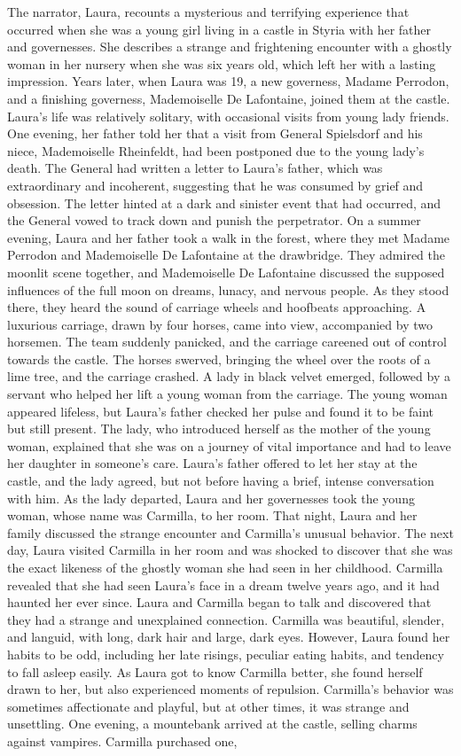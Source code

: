\documentclass{article} %
\begin{document}
The narrator, Laura, recounts a mysterious and terrifying experience that occurred when she was a young girl living in a castle in Styria with her father and governesses. She describes a strange and frightening encounter with a ghostly woman in her nursery when she was six years old, which left her with a lasting impression. Years later, when Laura was 19, a new governess, Madame Perrodon, and a finishing governess, Mademoiselle De Lafontaine, joined them at the castle. Laura's life was relatively solitary, with occasional visits from young lady friends. One evening, her father told her that a visit from General Spielsdorf and his niece, Mademoiselle Rheinfeldt, had been postponed due to the young lady's death. The General had written a letter to Laura's father, which was extraordinary and incoherent, suggesting that he was consumed by grief and obsession. The letter hinted at a dark and sinister event that had occurred, and the General vowed to track down and punish the perpetrator. On a summer evening, Laura and her father took a walk in the forest, where they met Madame Perrodon and Mademoiselle De Lafontaine at the drawbridge. They admired the moonlit scene together, and Mademoiselle De Lafontaine discussed the supposed influences of the full moon on dreams, lunacy, and nervous people. As they stood there, they heard the sound of carriage wheels and hoofbeats approaching. A luxurious carriage, drawn by four horses, came into view, accompanied by two horsemen. The team suddenly panicked, and the carriage careened out of control towards the castle. The horses swerved, bringing the wheel over the roots of a lime tree, and the carriage crashed. A lady in black velvet emerged, followed by a servant who helped her lift a young woman from the carriage. The young woman appeared lifeless, but Laura's father checked her pulse and found it to be faint but still present. The lady, who introduced herself as the mother of the young woman, explained that she was on a journey of vital importance and had to leave her daughter in someone's care. Laura's father offered to let her stay at the castle, and the lady agreed, but not before having a brief, intense conversation with him. As the lady departed, Laura and her governesses took the young woman, whose name was Carmilla, to her room. That night, Laura and her family discussed the strange encounter and Carmilla's unusual behavior. The next day, Laura visited Carmilla in her room and was shocked to discover that she was the exact likeness of the ghostly woman she had seen in her childhood. Carmilla revealed that she had seen Laura's face in a dream twelve years ago, and it had haunted her ever since. Laura and Carmilla began to talk and discovered that they had a strange and unexplained connection. Carmilla was beautiful, slender, and languid, with long, dark hair and large, dark eyes. However, Laura found her habits to be odd, including her late risings, peculiar eating habits, and tendency to fall asleep easily. As Laura got to know Carmilla better, she found herself drawn to her, but also experienced moments of repulsion. Carmilla's behavior was sometimes affectionate and playful, but at other times, it was strange and unsettling. One evening, a mountebank arrived at the castle, selling charms against vampires. Carmilla purchased one, 
\end{document}
